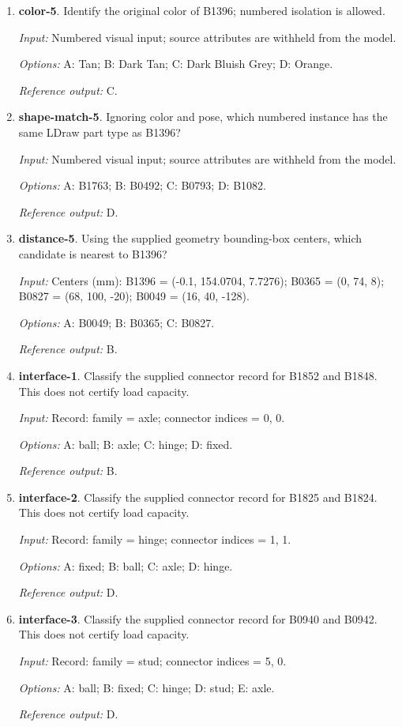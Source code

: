\begin{enumerate}
\item \textbf{color-5}. Identify the original color of B1396; numbered isolation is allowed.\par {\small \textit{Input:} Numbered visual input; source attributes are withheld from the model. \par\textit{Options:} A: Tan; B: Dark Tan; C: Dark Bluish Grey; D: Orange. \par\textit{Reference output:} C.}
\item \textbf{shape-match-5}. Ignoring color and pose, which numbered instance has the same LDraw part type as B1396?\par {\small \textit{Input:} Numbered visual input; source attributes are withheld from the model. \par\textit{Options:} A: B1763; B: B0492; C: B0793; D: B1082. \par\textit{Reference output:} D.}
\item \textbf{distance-5}. Using the supplied geometry bounding-box centers, which candidate is nearest to B1396?\par {\small \textit{Input:} Centers (mm): B1396 = (-0.1, 154.0704, 7.7276); B0365 = (0, 74, 8); B0827 = (68, 100, -20); B0049 = (16, 40, -128). \par\textit{Options:} A: B0049; B: B0365; C: B0827. \par\textit{Reference output:} B.}
\item \textbf{interface-1}. Classify the supplied connector record for B1852 and B1848. This does not certify load capacity.\par {\small \textit{Input:} Record: family = axle; connector indices = 0, 0. \par\textit{Options:} A: ball; B: axle; C: hinge; D: fixed. \par\textit{Reference output:} B.}
\item \textbf{interface-2}. Classify the supplied connector record for B1825 and B1824. This does not certify load capacity.\par {\small \textit{Input:} Record: family = hinge; connector indices = 1, 1. \par\textit{Options:} A: fixed; B: ball; C: axle; D: hinge. \par\textit{Reference output:} D.}
\item \textbf{interface-3}. Classify the supplied connector record for B0940 and B0942. This does not certify load capacity.\par {\small \textit{Input:} Record: family = stud; connector indices = 5, 0. \par\textit{Options:} A: ball; B: fixed; C: hinge; D: stud; E: axle. \par\textit{Reference output:} D.}

\end{enumerate}
